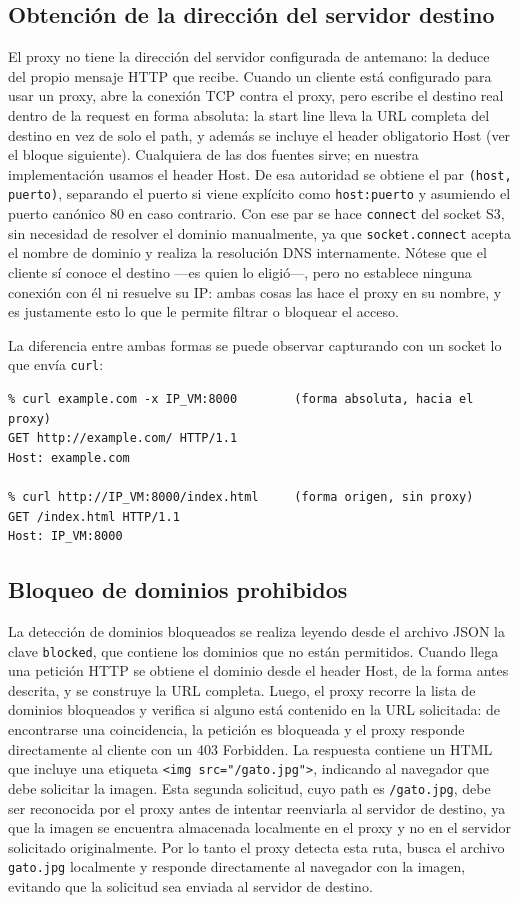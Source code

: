 \documentclass[
	spanish, %
	letterpaper, oneside
]{article}
\newcommand{\code}[1]{\texttt{#1}}    %
\newcommand{\cfgkey}[1]{\texttt{#1}}  %
\newcommand{\hdr}[1]{#1}              %
\newcommand{\status}[1]{#1}           %
\begin{document}
\subsection{Obtención de la dirección del servidor destino}
El proxy no tiene la dirección del servidor configurada de antemano: la deduce del propio mensaje HTTP que recibe.
Cuando un cliente está configurado para usar un proxy, abre la conexión TCP contra el proxy, pero escribe el destino real dentro de la request en forma absoluta: la start line lleva la URL completa del destino en vez de solo el path, y además se incluye el header obligatorio \hdr{Host} (ver el bloque siguiente).
Cualquiera de las dos fuentes sirve; en nuestra implementación usamos el header \hdr{Host}.
De esa autoridad se obtiene el par \code{(host, puerto)}, separando el puerto si viene explícito como \code{host:puerto} y asumiendo el puerto canónico 80 en caso contrario.
Con ese par se hace \code{connect} del socket S3, sin necesidad de resolver el dominio manualmente, ya que \code{socket.connect} acepta el nombre de dominio y realiza la resolución DNS internamente.
Nótese que el cliente sí conoce el destino ---es quien lo eligió---, pero no establece ninguna conexión con él ni resuelve su IP: ambas cosas las hace el proxy en su nombre, y es justamente esto lo que le permite filtrar o bloquear el acceso.

La diferencia entre ambas formas se puede observar capturando con un socket lo que envía \code{curl}:

\begin{verbatim}
% curl example.com -x IP_VM:8000        (forma absoluta, hacia el proxy)
GET http://example.com/ HTTP/1.1
Host: example.com

% curl http://IP_VM:8000/index.html     (forma origen, sin proxy)
GET /index.html HTTP/1.1
Host: IP_VM:8000
\end{verbatim}

\subsection{Bloqueo de dominios prohibidos}
La detección de dominios bloqueados se realiza leyendo desde el archivo JSON la clave \cfgkey{blocked}, que contiene los dominios que no están permitidos. Cuando llega una petición HTTP se obtiene el dominio desde el header \hdr{Host}, de la forma antes descrita, y se construye la URL completa. Luego, el proxy recorre la lista de dominios bloqueados y verifica si alguno está contenido en la URL solicitada: de encontrarse una coincidencia, la petición es bloqueada y el proxy responde directamente al cliente con un \status{403 Forbidden}. La respuesta contiene un HTML que incluye una etiqueta \verb|<img src="/gato.jpg">|, indicando al navegador que debe solicitar la imagen. Esta segunda solicitud, cuyo path es \code{/gato.jpg}, debe ser reconocida por el proxy antes de intentar reenviarla al servidor de destino, ya que la imagen se encuentra almacenada localmente en el proxy y no en el servidor solicitado originalmente. Por lo tanto el proxy detecta esta ruta, busca el archivo \code{gato.jpg} localmente y responde directamente al navegador con la imagen, evitando que la solicitud sea enviada al servidor de destino.
\end{document}
